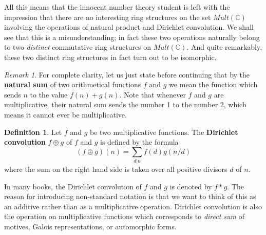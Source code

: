 \documentclass[a4paper]{article}
\theoremstyle{definition}
\newtheorem{definition}{Definition}[section]
\theoremstyle{remark}
\newtheorem*{remark}{Remark}
\newcommand{\defhl}[1]{\textbf{#1}}
\begin{document}
All this means that the innocent number theory student is left with the impression that there are no interesting ring structures on the set $Mult(\mathbb{C})$ involving the operations of natural product and Dirichlet convolution. We shall see that this is a misunderstanding; in fact these two operations naturally belong to two \emph{distinct} commutative ring structures on $Mult(\mathbb{C})$. And quite remarkably, these two distinct ring structures in fact turn out to be isomorphic.

\begin{remark}
For complete clarity, let us just state before continuing that by the \defhl{natural sum} of two arithmetical functions $f$ and $g$ we mean the function which sends $n$ to the value $f(n)+g(n)$. Note that whenever $f$ and $g$ are multiplicative, their natural sum sends the number 1 to the number 2, which means it cannot ever be multiplicative.
\end{remark}

\begin{definition}
Let $f$ and $g$ be two multiplicative functions. The \defhl{Dirichlet convolution} $f \oplus g$ of $f$ and $g$ is defined by the formula
$$ (f \oplus g)(n) =  \sum_{d \vert n} f(d) g(n/d)  $$
where the sum on the right hand side is taken over all positive divisors $d$ of $n$. 
\end{definition}
In many books, the Dirichlet convolution of $f$ and $g$ is denoted by $f * g$. The reason for introducing non-standard notation is that we want to think of this as an additive rather than as a multiplicative operation. Dirichlet convolution is also the operation on multiplicative functions which corresponds to \emph{direct sum} of motives, Galois representations, or automorphic forms.

\end{document}
